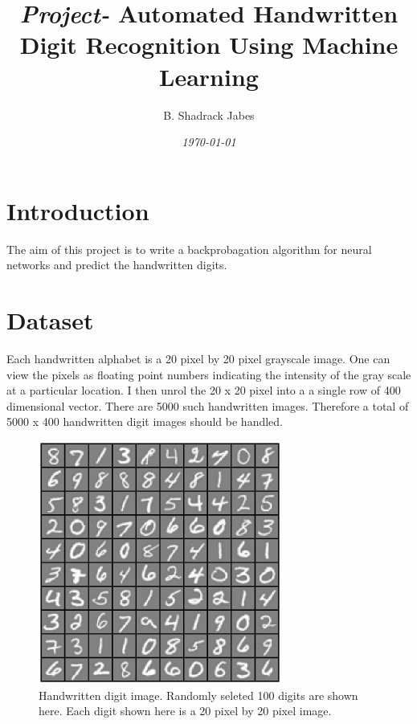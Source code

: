 \documentclass[twocolumn]{article}
\title {{\it Project-} Automated Handwritten Digit Recognition Using Machine Learning}
\author{B. Shadrack Jabes}
\date{\it{\today}}
\begin{document}
\maketitle

\section{Introduction}
The aim of this project is to write a backprobagation algorithm for neural networks and predict the handwritten digits. 
\section{Dataset}
Each handwritten alphabet is a 20 pixel by 20 pixel grayscale image. One can view the pixels as floating point numbers indicating the intensity of the gray scale at a particular location. I then unrol the 20 x 20 pixel into a a single row of 400 dimensional vector. There are 5000 such handwritten images. Therefore a total of 5000 x 400 handwritten digit images should be handled.
	   \begin{figure}[htbp]
                \centering
                \includegraphics[clip=true,trim=0cm 0cm 0cm 0cm,width=8cm]{../dataset.ps}
                        \caption{Handwritten digit image. Randomly seleted 100 digits are shown here. Each digit shown here is a 20 pixel by 20 pixel image.}
                \label{fig:dataset}
                \end{figure}
\end{document}
